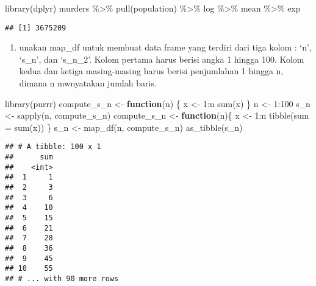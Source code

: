 \documentclass[
]{article}
\newenvironment{Shaded}{\begin{snugshade}}{\end{snugshade}}
\newcommand{\AttributeTok}[1]{\textcolor[rgb]{0.77,0.63,0.00}{#1}}
\newcommand{\ControlFlowTok}[1]{\textcolor[rgb]{0.13,0.29,0.53}{\textbf{#1}}}
\newcommand{\DecValTok}[1]{\textcolor[rgb]{0.00,0.00,0.81}{#1}}
\newcommand{\FunctionTok}[1]{\textcolor[rgb]{0.00,0.00,0.00}{#1}}
\newcommand{\NormalTok}[1]{#1}
\newcommand{\OtherTok}[1]{\textcolor[rgb]{0.56,0.35,0.01}{#1}}
\newcommand{\SpecialCharTok}[1]{\textcolor[rgb]{0.00,0.00,0.00}{#1}}
\providecommand{\tightlist}{%
  \setlength{\itemsep}{0pt}\setlength{\parskip}{0pt}}
\begin{document}
\begin{Shaded}
\begin{Highlighting}[]
\FunctionTok{library}\NormalTok{(dplyr)}
\NormalTok{murders }\SpecialCharTok{\%\textgreater{}\%}
  \FunctionTok{pull}\NormalTok{(population) }\SpecialCharTok{\%\textgreater{}\%}
\NormalTok{  log }\SpecialCharTok{\%\textgreater{}\%}
\NormalTok{  mean }\SpecialCharTok{\%\textgreater{}\%}
\NormalTok{  exp }
\end{Highlighting}
\end{Shaded}

\begin{verbatim}
## [1] 3675209
\end{verbatim}

\begin{enumerate}
\def\labelenumi{\arabic{enumi}.}
\setcounter{enumi}{3}
\tightlist
\item
  unakan map\_df untuk membuat data frame yang terdiri dari tiga kolom :
  `n', `s\_n', dan `s\_n\_2'. Kolom pertama harus berisi angka 1 hingga
  100. Kolom kedua dan ketiga masing-masing harus berisi penjumlahan 1
  hingga n, dimana n mwnyatakan jumlah baris.
\end{enumerate}

\begin{Shaded}
\begin{Highlighting}[]
\FunctionTok{library}\NormalTok{(purrr)}
\NormalTok{compute\_s\_n }\OtherTok{\textless{}{-}} \ControlFlowTok{function}\NormalTok{(n) \{}
\NormalTok{  x }\OtherTok{\textless{}{-}} \DecValTok{1}\SpecialCharTok{:}\NormalTok{n}
  \FunctionTok{sum}\NormalTok{(x)}
\NormalTok{\}}
\NormalTok{n }\OtherTok{\textless{}{-}} \DecValTok{1}\SpecialCharTok{:}\DecValTok{100}
\NormalTok{s\_n }\OtherTok{\textless{}{-}} \FunctionTok{sapply}\NormalTok{(n, compute\_s\_n)}
\NormalTok{compute\_s\_n }\OtherTok{\textless{}{-}} \ControlFlowTok{function}\NormalTok{(n)\{}
\NormalTok{  x }\OtherTok{\textless{}{-}} \DecValTok{1}\SpecialCharTok{:}\NormalTok{n}
  \FunctionTok{tibble}\NormalTok{(}\AttributeTok{sum =} \FunctionTok{sum}\NormalTok{(x))}
\NormalTok{\}}
\NormalTok{s\_n }\OtherTok{\textless{}{-}} \FunctionTok{map\_df}\NormalTok{(n, compute\_s\_n)}
\FunctionTok{as\_tibble}\NormalTok{(s\_n)}
\end{Highlighting}
\end{Shaded}

\begin{verbatim}
## # A tibble: 100 x 1
##      sum
##    <int>
##  1     1
##  2     3
##  3     6
##  4    10
##  5    15
##  6    21
##  7    28
##  8    36
##  9    45
## 10    55
## # ... with 90 more rows
\end{verbatim}
\end{document}
